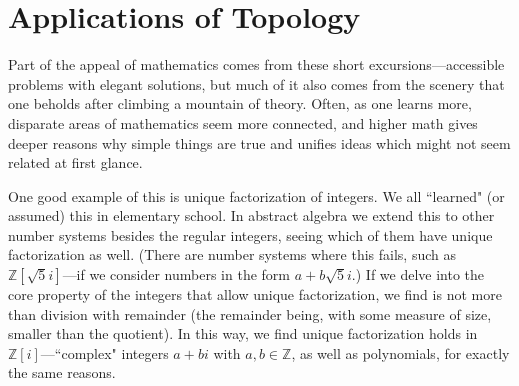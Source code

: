 \documentclass[12pt,twoside]{article}
\theoremstyle{norm}
\newcommand{\Z}[0]{\mathbb{Z}}
\begin{document}
\section{Applications of Topology}
Part of the appeal of mathematics comes from these short excursions---accessible problems with elegant solutions, but much of it also comes from 
the scenery that one beholds after climbing a mountain of theory. 
Often, as one learns more, disparate areas of mathematics seem more connected, and higher math gives deeper reasons why simple things are true and unifies ideas which might not seem related at first glance.

One good example of this is unique factorization of integers. We all ``learned" (or assumed) this in elementary school.
In abstract algebra we extend this to other number systems besides the regular integers, seeing which of them have unique factorization as well. (There are number systems where this fails, such as $\Z[\sqrt{5}i]$---if we consider numbers in the form $a+b\sqrt{5}i$.) If we delve into the core property of the integers that allow unique factorization, we find is not more than division with remainder (the remainder being, with some measure of size, smaller than the quotient). In this way, we find unique factorization holds in $\Z[i]$---``complex" integers $a+bi$ with $a,b\in \Z$, as well as polynomials, for exactly the same reasons.
\end{document}
